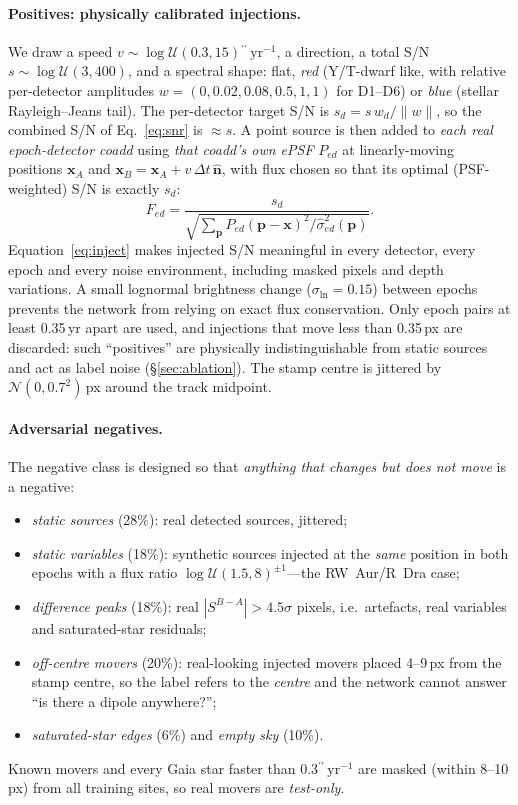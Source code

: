 \documentclass[10pt,twocolumn]{article}
\newcommand{\asecyr}{\ensuremath{^{\prime\prime}\,\mathrm{yr}^{-1}}}
\newcommand{\SN}{S/N}
\begin{document}
\paragraph{Positives: physically calibrated injections.} We draw a speed $v\sim\log\mathcal U(0.3,15)$\asecyr,
a direction, a total \SN{} $s\sim\log\mathcal U(3,400)$, and a spectral shape: flat, \emph{red} (Y/T-dwarf
like, with relative per-detector amplitudes $w=(0,0.02,0.08,0.5,1,1)$ for D1--D6) or \emph{blue}
(stellar Rayleigh--Jeans tail). The per-detector target \SN{} is $s_d=s\,w_d/\lVert w\rVert$, so the
combined \SN{} of Eq.~\eqref{eq:snr} is $\approx s$. A point source is then added to \emph{each real
epoch-detector coadd} using \emph{that coadd's own ePSF} $P_{ed}$ at linearly-moving positions
$\mathbf x_A$ and $\mathbf x_B=\mathbf x_A+v\,\Delta t\,\hat{\mathbf n}$, with flux chosen so that its
optimal (PSF-weighted) \SN{} is exactly $s_d$:
\begin{equation}
  F_{ed} = \frac{s_d}{\sqrt{\sum_{\mathbf p} P_{ed}(\mathbf p-\mathbf x)^2/\hat\sigma^2_{ed}(\mathbf p)}}.
  \label{eq:inject}
\end{equation}
Equation~\eqref{eq:inject} makes injected \SN{} meaningful in every detector, every epoch and every
noise environment, including masked pixels and depth variations. A small lognormal brightness change
($\sigma_{\ln}=0.15$) between epochs prevents the network from relying on exact flux conservation. Only
epoch pairs at least 0.35\,yr apart are used, and injections that move less than 0.35\,px are discarded:
such ``positives'' are physically indistinguishable from static sources and act as label noise
(\S\ref{sec:ablation}). The stamp centre is jittered by $\mathcal N(0,0.7^2)$\,px around the track midpoint.

\paragraph{Adversarial negatives.} The negative class is designed so that \emph{anything that changes but
does not move} is a negative:
\begin{itemize}
  \item \emph{static sources} (28\%): real detected sources, jittered;
  \item \emph{static variables} (18\%): synthetic sources injected at the \emph{same} position in both
        epochs with a flux ratio $\log\mathcal U(1.5,8)^{\pm1}$---the RW~Aur/R~Dra case;
  \item \emph{difference peaks} (18\%): real $|S^{B-A}|>4.5\sigma$ pixels, i.e.\ artefacts, real variables
        and saturated-star residuals;
  \item \emph{off-centre movers} (20\%): real-looking injected movers placed 4--9\,px from the stamp centre,
        so the label refers to the \emph{centre} and the network cannot answer ``is there a dipole
        anywhere?'';
  \item \emph{saturated-star edges} (6\%) and \emph{empty sky} (10\%).
\end{itemize}
Known movers and every Gaia star faster than 0.3\asecyr{} are masked (within 8--10\,px) from all training
sites, so real movers are \emph{test-only}.
\end{document}
